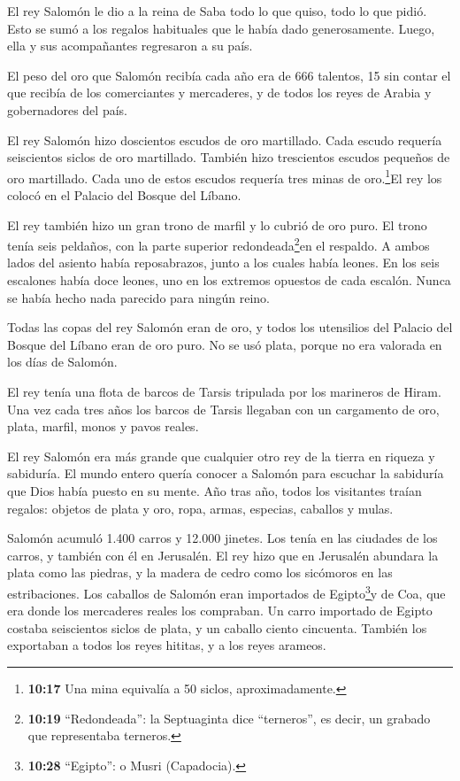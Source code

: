  El rey Salomón le dio a la reina de Saba todo lo que
quiso, todo lo que pidió. Esto se sumó a los regalos habituales que le
había dado generosamente. Luego, ella y sus acompañantes regresaron a su
país.

 El peso del oro que Salomón recibía cada año era de 666
talentos, 15 sin contar el que recibía de los comerciantes y mercaderes,
y de todos los reyes de Arabia y gobernadores del país.

 El rey Salomón hizo doscientos escudos de oro martillado.
Cada escudo requería seiscientos siclos de oro martillado. 
También hizo trescientos escudos pequeños de oro martillado. Cada uno de
estos escudos requería tres minas de oro.\footnote{\textbf{10:17} Una
  mina equivalía a 50 siclos, aproximadamente.}El rey los colocó en el
Palacio del Bosque del Líbano.

 El rey también hizo un gran trono de marfil y lo cubrió de
oro puro.  El trono tenía seis peldaños, con la parte
superior redondeada\footnote{\textbf{10:19} ``Redondeada'': la
  Septuaginta dice ``terneros'', es decir, un grabado que representaba
  terneros.}en el respaldo. A ambos lados del asiento había
reposabrazos, junto a los cuales había leones.  En los seis
escalones había doce leones, uno en los extremos opuestos de cada
escalón. Nunca se había hecho nada parecido para ningún reino.

 Todas las copas del rey Salomón eran de oro, y todos los
utensilios del Palacio del Bosque del Líbano eran de oro puro. No se usó
plata, porque no era valorada en los días de Salomón.

 El rey tenía una flota de barcos de Tarsis tripulada por
los marineros de Hiram. Una vez cada tres años los barcos de Tarsis
llegaban con un cargamento de oro, plata, marfil, monos y pavos reales.

 El rey Salomón era más grande que cualquier otro rey de la
tierra en riqueza y sabiduría.  El mundo entero quería
conocer a Salomón para escuchar la sabiduría que Dios había puesto en su
mente.  Año tras año, todos los visitantes traían regalos:
objetos de plata y oro, ropa, armas, especias, caballos y mulas.

 Salomón acumuló 1.400 carros y 12.000 jinetes. Los tenía
en las ciudades de los carros, y también con él en Jerusalén.
 El rey hizo que en Jerusalén abundara la plata como las
piedras, y la madera de cedro como los sicómoros en las estribaciones.
 Los caballos de Salomón eran importados de
Egipto\footnote{\textbf{10:28} ``Egipto'': o Musri (Capadocia).}y de
Coa, que era donde los mercaderes reales los compraban.  Un
carro importado de Egipto costaba seiscientos siclos de plata, y un
caballo ciento cincuenta. También los exportaban a todos los reyes
hititas, y a los reyes arameos.

